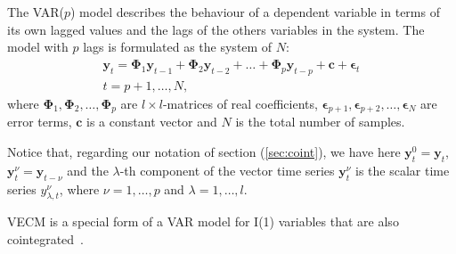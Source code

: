 \documentclass[twocolumn]{svjour3}          %
\begin{document}
The VAR($p$) model describes the behaviour of a dependent variable in terms of
its own lagged values and the lags of the others variables in the system. The
model with $p$ lags is formulated as the system of $N$:
\begin{align}
\label{eq:var}
\mathbf{y}_t 
= \boldsymbol{\Phi}_1 \mathbf{y}_{t-1} +
  \boldsymbol{\Phi}_2 \mathbf{y}_{t-2} + \dots +
  \boldsymbol{\Phi}_p\mathbf{y}_{t-p} +
  \mathbf{c} + \boldsymbol{\epsilon}_t \nonumber \\
t=p+1,\dots,N,
\end{align}
\noindent where 
$\boldsymbol{\Phi}_1, \boldsymbol{\Phi}_2,\dots,\boldsymbol{\Phi}_p$
are $l\times l$-matrices of real coefficients,
$\boldsymbol{\epsilon}_{p+1},
 \boldsymbol{\epsilon}_{p+2}, \dots, \boldsymbol{\epsilon}_N$ 
are error terms, $\mathbf{c}$ is a constant vector and $N$ is the total
number of samples.

Notice that, regarding our notation of section (\ref{sec:coint}),
we have here 
$\mathbf{y}_t^0 = \mathbf{y}_t$,
$\mathbf{y}_t^\nu = \mathbf{y}_{t-\nu}$ and
the $\lambda$-th component of the vector time series $\mathbf{y}_t^\nu$
is the scalar time series $y_{\lambda,t}^\nu$, where $\nu=1,\dots,p$ and
$\lambda=1,\dots,l$.

VECM is a special form of a VAR model for I(1) variables that are also
cointegrated~\cite{johansen1991,banerjee1993}.
\end{document}
